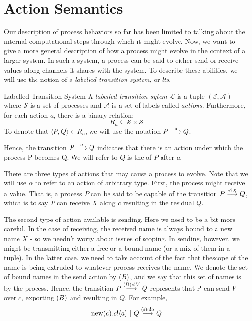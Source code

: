 \section{Action Semantics}
Our description of process behaviors so far has been limited to talking about the internal computational steps through which it might evolve.  Now, we want to give a more general description of how a process might evolve in the context of a larger system.  In such a system, a process can be said to either send or receive values along channels it shares with the system.  To describe these abilities, we will use the notion of a \emph{labelled transition system}, or \emph{lts}.

\begin{definition}{Labelled Transition System}
	A \emph{labelled transition sytem} $\mathcal{L}$ is a tuple $(\mathcal{S}, \mathcal{A})$ 
where $\mathcal{S}$ is a set of processes and $\mathcal{A}$ is a set of labels called \emph{actions}.  Furthermore, for each action $a$, there is a binary relation:
	\[
		R_a \subseteq \mathcal{S} \times \mathcal{S}
	\]
	To denote that $\langle P,Q\rangle \in R_a$, we will use the notation $P \overset{{a}}{\longrightarrow} Q$.
\end{definition}
Hence, the transition $P \overset{{a}}{\longrightarrow} Q$ indicates that there is an action under which the process P becomes Q.  We will refer to $Q$ is the  of $P$ after $a$.

There are three types of actions that may cause a process to evolve.  Note that we will use $\alpha$ to refer to an action of arbitrary type.  First, the process might receive a value.  That is, a process $P$ can be said to be capable of the transition $P \overset{{{c}?{X}}}{\longrightarrow} Q$, which is to say $P$ can receive $X$ along $c$ resulting in the residual $Q$.

The second type of action available is sending.  Here we need to be a bit more careful.  In the case of receiving, the received name is always bound to a new name $X$ - so we needn't worry about issues of scoping.  In sending, however, we might be transmitting either a free or a bound name (or a mix of them in a tuple).  In the latter case, we need to take account of the fact that thescope of the name is being extruded to whatever process receives the name.  We denote the set of bound names in the send action by $({B})$, and we say that this set of names is  by the process.  Hence, the transition $P \overset{{({B}){c}!{V}}}{\longrightarrow} Q$ represents that P can send $V$ over $c$, exporting $({B})$ and resulting in $Q$.  For example,
\[
	\text{new}({a}).{c}!\langle{a}\rangle \ |\  Q \overset{{({b}){c}!{a}}}{\longrightarrow} Q
\]

